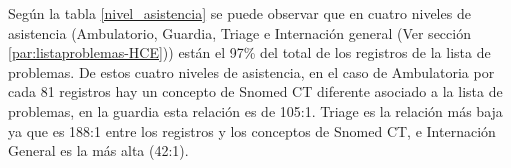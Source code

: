 
Según la tabla \ref{nivel_asistencia} se puede observar que en cuatro niveles de asistencia (Ambulatorio, Guardia, Triage e Internación general (Ver sección \ref{par:listaproblemas-HCE})) están el 97\% del total de los registros de la lista de problemas. De estos cuatro niveles de asistencia, en el caso de Ambulatoria por cada 81 registros hay un concepto de Snomed CT diferente asociado a la lista de problemas, en la guardia esta relación es de 105:1. Triage es la relación más baja ya que es 188:1 entre los registros y los conceptos de Snomed  CT, e Internación General es la más alta (42:1).

